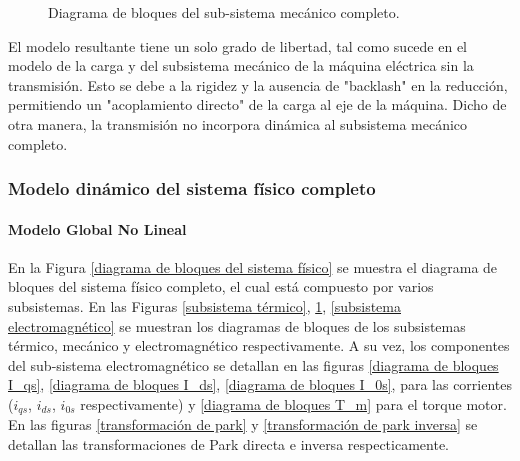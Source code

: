\documentclass[a4paper, 10pt, journal]{ieeeconf}
\begin{document}
\begin{figure}[thpb]
    \centering
    \begin{adjustbox}{max width=\columnwidth}
    \end{adjustbox}
    \caption{Diagrama de bloques del sub-sistema mecánico completo.}
    \label{diagrama de bloques sub-sistema mecánico completo}
\end{figure}

El modelo resultante tiene un solo grado de libertad, tal como sucede en el modelo de la carga y del subsistema mecánico de la máquina eléctrica sin la transmisión. Esto se debe a la rigidez y la ausencia de "backlash" en la reducción, permitiendo un "acoplamiento directo" de la carga al eje de la máquina. Dicho de otra manera, la transmisión no incorpora dinámica al subsistema mecánico completo.



\subsubsection{\textbf{Modelo dinámico del sistema físico completo}}
\paragraph{\textbf{Modelo Global No Lineal}}
En la Figura \ref{diagrama de bloques del sistema físico} se muestra
el diagrama de bloques del sistema físico completo, el cual está compuesto por varios subsistemas. En las Figuras \ref{subsistema térmico}, \ref{diagrama de bloques sub-sistema mecánico completo},
\ref{subsistema electromagnético} se muestran los diagramas de bloques de los subsistemas térmico, mecánico y electromagnético respectivamente. A su vez, los componentes del sub-sistema electromagnético se detallan
en las figuras \ref{diagrama de bloques I_qs}, \ref{diagrama de bloques I_ds}, \ref{diagrama de bloques I_0s}, para las corrientes ($i_{qs}$, $i_{ds}$, $i_{0s}$ respectivamente) y \ref{diagrama de bloques T_m} para el torque motor.
En las figuras \ref{transformación de park} y \ref{transformación de park inversa} se detallan las transformaciones de Park directa e inversa respecticamente.
\end{document}
